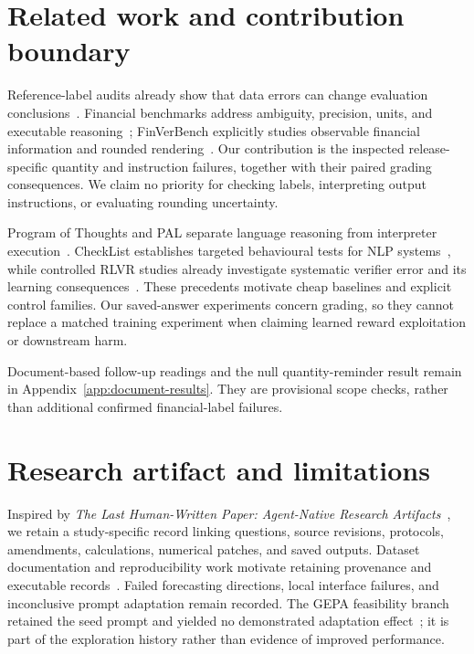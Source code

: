 \section{Related work and contribution boundary}
Reference-label audits already show that data errors can change evaluation conclusions~\cite{labelerrors}. Financial benchmarks address ambiguity, precision, units, and executable reasoning~\cite{financereasoning,finchain}; FinVerBench explicitly studies observable financial information and rounded rendering~\cite{finverbench}. Our contribution is the inspected release-specific quantity and instruction failures, together with their paired grading consequences. We claim no priority for checking labels, interpreting output instructions, or evaluating rounding uncertainty.

Program of Thoughts and PAL separate language reasoning from interpreter execution~\cite{pot,pal}. CheckList establishes targeted behavioural tests for NLP systems~\cite{checklist}, while controlled RLVR studies already investigate systematic verifier error and its learning consequences~\cite{verifiernoise}. These precedents motivate cheap baselines and explicit control families. Our saved-answer experiments concern grading, so they cannot replace a matched training experiment when claiming learned reward exploitation or downstream harm.

Document-based follow-up readings and the null quantity-reminder result remain in Appendix~\ref{app:document-results}. They are provisional scope checks, rather than additional confirmed financial-label failures.

\section{Research artifact and limitations}
Inspired by \emph{The Last Human-Written Paper: Agent-Native Research Artifacts}~\cite{ara}, we retain a study-specific record linking questions, source revisions, protocols, amendments, calculations, numerical patches, and saved outputs. Dataset documentation and reproducibility work motivate retaining provenance and executable records~\cite{datasheets,reproducibility}. Failed forecasting directions, local interface failures, and inconclusive prompt adaptation remain recorded. The GEPA feasibility branch retained the seed prompt and yielded no demonstrated adaptation effect~\cite{gepa}; it is part of the exploration history rather than evidence of improved performance.

